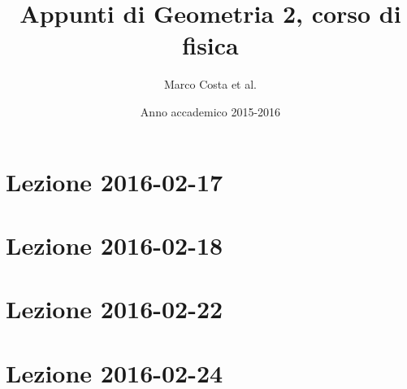 \documentclass[a4paper]{article}
\title{Appunti di Geometria 2, corso di fisica}
\author{Marco Costa et al.}
\date{Anno accademico 2015-2016}
\theoremstyle{definition}
\theoremstyle{plain}
\theoremstyle{remark}
\newenvironment{lesson}[3]{%
\section{Lezione #1-#2-#3}}{%
}
\newcommand\includelesson[3]{%
\begin{lesson}{#1}{#2}{#3}

\end{lesson}}
\begin{document}
\maketitle

\tableofcontents

\includelesson{2016}{02}{17}
\includelesson{2016}{02}{18}
\includelesson{2016}{02}{22}
\includelesson{2016}{02}{24}
\end{document}
